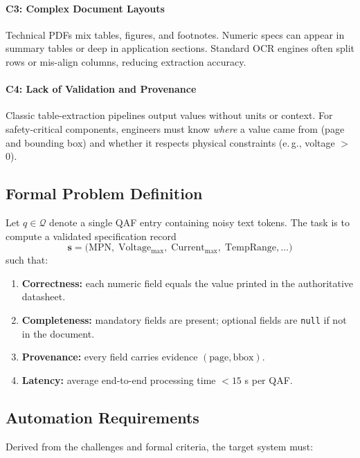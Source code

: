 \paragraph{C3: Complex Document Layouts}  
Technical PDFs mix tables, figures, and footnotes.  
Numeric specs can appear in summary tables or deep in application sections.  
Standard OCR engines often split rows or mis-align columns, reducing extraction accuracy.

\paragraph{C4: Lack of Validation and Provenance}  
Classic table-extraction pipelines output values without units or context.  
For safety-critical components, engineers must know \emph{where} a value came from (page and bounding box) and whether it respects physical constraints (e.\,g., voltage $>$ 0).

\subsection{Formal Problem Definition}
Let $q \in \mathcal{Q}$ denote a single QAF entry containing noisy text tokens.  
The task is to compute a validated specification record  
\[
\mathbf{s} = \bigl(\mathrm{MPN},\; \mathrm{Voltage_{max}},\; \mathrm{Current_{max}},\; \mathrm{TempRange},\dots\bigr)
\]  
such that:

\begin{enumerate}[label=P\arabic*]
  \item \textbf{Correctness:} each numeric field equals the value printed in the authoritative datasheet.  
  \item \textbf{Completeness:} mandatory fields are present; optional fields are \texttt{null} if not in the document.  
  \item \textbf{Provenance:} every field carries evidence $(\text{page}, \text{bbox})$.  
  \item \textbf{Latency:} average end-to-end processing time $<15$ s per QAF.  
\end{enumerate}

\subsection{Automation Requirements}
Derived from the challenges and formal criteria, the target system must:

